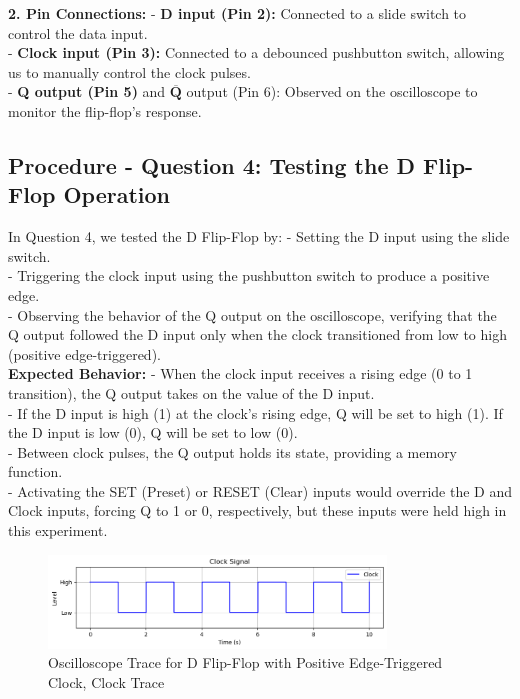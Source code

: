 \documentclass{article}
\begin{document}
    \textbf{2. Pin Connections:}
    - \textbf{D input (Pin 2):} Connected to a slide switch to control the data input.
    \\
    - \textbf{Clock input (Pin 3):} Connected to a debounced pushbutton switch, allowing us to manually control the clock pulses.
    \\
    - \textbf{Q output (Pin 5)} and \(\overline{\textbf{Q}}\) output (Pin 6): Observed on the oscilloscope to monitor the flip-flop’s response.
    \\

    \subsection*{\textbf{Procedure - Question 4: Testing the D Flip-Flop Operation}}
    In Question 4, we tested the D Flip-Flop by:
    - Setting the D input using the slide switch.
    \\
    - Triggering the clock input using the pushbutton switch to produce a positive edge.
    \\
    - Observing the behavior of the Q output on the oscilloscope, verifying that the Q output followed the D input only when the clock transitioned from low to high (positive edge-triggered).
    \\

    \textbf{Expected Behavior:}
    - When the clock input receives a rising edge (0 to 1 transition), the Q output takes on the value of the D input.
    \\
    - If the D input is high (1) at the clock’s rising edge, Q will be set to high (1). If the D input is low (0), Q will be set to low (0).
    \\
    - Between clock pulses, the Q output holds its state, providing a memory function.
    \\
    - Activating the SET (Preset) or RESET (Clear) inputs would override the D and Clock inputs, forcing Q to 1 or 0, respectively, but these inputs were held high in this experiment.
    \\

    \begin{figure}[H]
        \centering
        \includegraphics[width=0.8\textwidth]{./img/Lab 11/11_3_1.png}  %
        \caption{Oscilloscope Trace for D Flip-Flop with Positive Edge-Triggered Clock, Clock Trace}
        \label{fig:D_FlipFlop_Oscilloscope_1}
    \end{figure}
\end{document}
